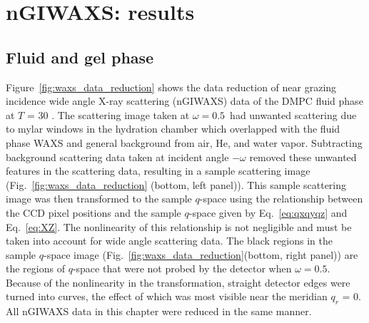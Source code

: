 


\newpage
\section{nGIWAXS: results}\label{sec:nGIWAXS_results}
\subsection{Fluid and gel phase}\label{sec:nGIWAXS_fluid_gel_phase}
Figure~\ref{fig:waxs_data_reduction} shows the data reduction of 
near grazing incidence wide angle X-ray scattering (nGIWAXS) data of
the DMPC fluid phase at $T$ = 30 \textcelsius.
The scattering image taken at $\omega=0.5$\textdegree\ had unwanted
scattering due to mylar windows in the hydration chamber which
overlapped with the fluid phase WAXS 
and general background from air, He, and water vapor.
Subtracting background scattering data taken at incident angle $-\omega$  
removed these unwanted features in the scattering data, 
resulting in a sample scattering image 
(Fig.~\ref{fig:waxs_data_reduction} (bottom, left panel)).
This sample scattering image was then transformed to the
sample $q$-space using the relationship between the CCD 
pixel positions and the sample $q$-space
given by Eq.~\ref{eq:qxqyqz} and Eq.~\ref{eq:XZ}. The nonlinearity of this
relationship is
not negligible and must be taken into account for wide angle scattering data.
The black regions in the sample $q$-space image
(Fig.~\ref{fig:waxs_data_reduction}(bottom, right panel))
are the regions of $q$-space that were
not probed by the detector when $\omega=0.5$. Because of the nonlinearity in the 
transformation, straight detector edges were turned into curves, the effect of
which was most visible near the meridian $q_r$ = 0. All nGIWAXS data
in this chapter were reduced in the same manner.

